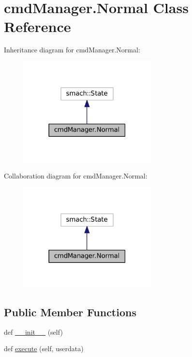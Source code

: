 \hypertarget{classcmdManager_1_1Normal}{}\section{cmd\+Manager.\+Normal Class Reference}
\label{classcmdManager_1_1Normal}


Inheritance diagram for cmd\+Manager.\+Normal\+:\nopagebreak
\begin{figure}[H]
\begin{center}
\leavevmode
\includegraphics[width=198pt]{classcmdManager_1_1Normal__inherit__graph}
\end{center}
\end{figure}


Collaboration diagram for cmd\+Manager.\+Normal\+:\nopagebreak
\begin{figure}[H]
\begin{center}
\leavevmode
\includegraphics[width=198pt]{classcmdManager_1_1Normal__coll__graph}
\end{center}
\end{figure}
\subsection*{Public Member Functions}
\begin{DoxyCompactItemize}
\item 
def \hyperlink{classcmdManager_1_1Normal_ab492c9d6b86cabc1673e7d128d554c17}{\+\_\+\+\_\+init\+\_\+\+\_\+} (self)
\item 
def \hyperlink{classcmdManager_1_1Normal_a3290ae1ca5346a38bd735b24ed20d359}{execute} (self, userdata)
\end{DoxyCompactItemize}
